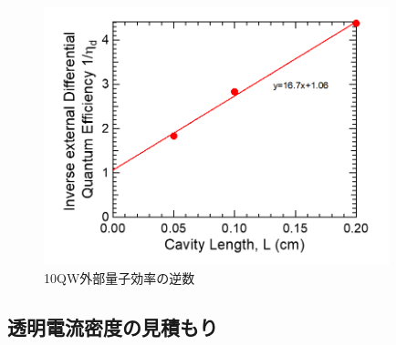{\begin{figure}[h]
	\centering
	\includegraphics[width=10cm]{figure/fig_3_1_10QW_broadcontact_id_inverse.png}
	\caption{10QW外部量子効率の逆数}
	\label{fig:fig_3_1_10QW_broadcontact_id_inverse}
\end{figure}

\clearpage
\subsection{透明電流密度の見積もり}

}
